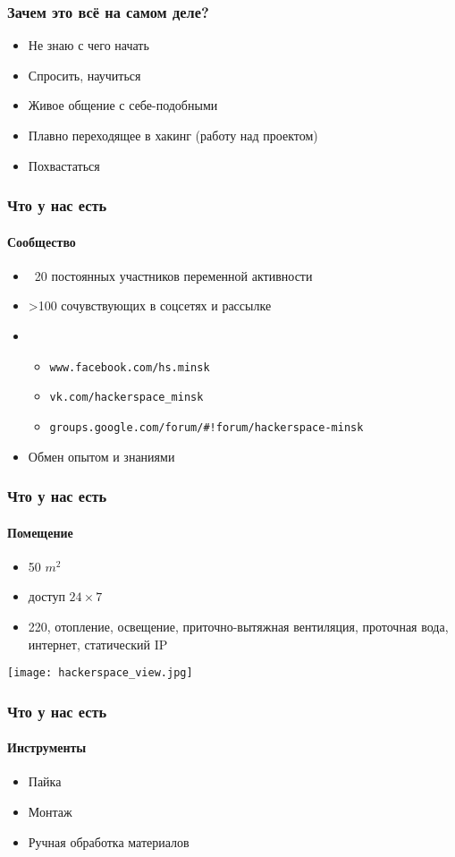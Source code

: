 \documentclass{beamer}
\begin{document}
\begin {frame}
\frametitle {Зачем это всё на самом деле?}
\begin{itemize}
\item Не знаю с чего начать
\item Спросить, научиться
\item Живое общение с себе-подобными
\item Плавно переходящее в хакинг (работу над проектом)
\item Похвастаться
\end{itemize}
\end {frame}


\begin {frame}
\frametitle {Что у нас есть}
\framesubtitle {Сообщество}
\begin{itemize}
\item ~20 постоянных участников переменной активности
\item >100 сочувствующих в соцсетях и рассылке
\item
  \begin{itemize}
    \item \texttt{www.facebook.com/hs.minsk}
    \item \texttt{vk.com/hackerspace\_minsk}
    \item \texttt{groups.google.com/forum/\#!forum/hackerspace-minsk}
  \end{itemize}
\item Обмен опытом и знаниями
\end{itemize}
\end {frame}


\begin {frame}
\frametitle {Что у нас есть}
\framesubtitle {Помещение}
\begin{itemize}
\item 50 \(m^2\)
\item доступ \(24\times7\)
\item 220, отопление, освещение, приточно-вытяжная вентиляция, проточная вода, интернет, статический IP
\end{itemize}
\begin{center}
  \texttt{[image: hackerspace\_view.jpg]}
\end{center}
\end {frame}


\begin {frame}
\frametitle {Что у нас есть}
\framesubtitle {Инструменты}
\begin{itemize}
\item Пайка
\item Монтаж
\item Ручная обработка материалов
\end{itemize}
\end {frame}
\end{document}
